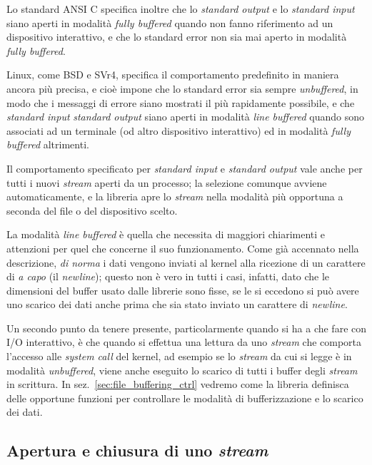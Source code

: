 Lo standard ANSI C specifica inoltre che lo \textit{standard output} e lo
\textit{standard input} siano aperti in modalità \textit{fully buffered}
quando non fanno riferimento ad un dispositivo interattivo, e che lo standard
error non sia mai aperto in modalità \textit{fully buffered}.

Linux, come BSD e SVr4, specifica il comportamento predefinito in maniera
ancora più precisa, e cioè impone che lo standard error sia sempre
\textit{unbuffered}, in modo che i messaggi di errore siano mostrati il più
rapidamente possibile, e che \textit{standard input} \textit{standard output}
siano aperti in modalità \textit{line buffered} quando sono associati ad un
terminale (od altro dispositivo interattivo) ed in modalità \textit{fully
  buffered} altrimenti.

Il comportamento specificato per \textit{standard input} e \textit{standard
  output} vale anche per tutti i nuovi \textit{stream} aperti da un processo;
la selezione comunque avviene automaticamente, e la libreria apre lo
\textit{stream} nella modalità più opportuna a seconda del file o del
dispositivo scelto.

La modalità \textit{line buffered} è quella che necessita di maggiori
chiarimenti e attenzioni per quel che concerne il suo funzionamento. Come già
accennato nella descrizione, \emph{di norma} i dati vengono inviati al kernel
alla ricezione di un carattere di \textsl{a capo} (il \textit{newline});
questo non è vero in tutti i casi, infatti, dato che le dimensioni del buffer
usato dalle librerie sono fisse, se le si eccedono si può avere uno scarico
dei dati anche prima che sia stato inviato un carattere di \textit{newline}.

Un secondo punto da tenere presente, particolarmente quando si ha a che fare
con I/O interattivo, è che quando si effettua una lettura da uno
\textit{stream} che comporta l'accesso alle \textit{system call} del kernel,
ad esempio se lo \textit{stream} da cui si legge è in modalità
\textit{unbuffered}, viene anche eseguito lo scarico di tutti i buffer degli
\textit{stream} in scrittura. In sez.~\ref{sec:file_buffering_ctrl} vedremo
come la libreria definisca delle opportune funzioni per controllare le
modalità di bufferizzazione e lo scarico dei dati.



\subsection{Apertura e chiusura di uno \textit{stream}}
\label{sec:file_fopen}

